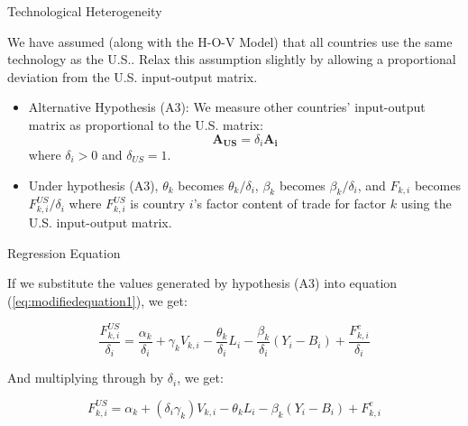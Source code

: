 \documentclass[aspectratio=169]{beamer}
\begin{document}
\begin{frame}{Technological Heterogeneity}

We have assumed (along with the H-O-V Model) that all countries use the same technology as the U.S..  Relax this assumption slightly by allowing a proportional deviation from the U.S. input-output matrix.

\begin{itemize}
    \item<1-> Alternative Hypothesis (A3):  We measure other countries’ input-output matrix as proportional to the U.S. matrix:
    \begin{equation*}
        \mathbf{A_{US}} = \delta_{i} \mathbf{A_{i}}
    \end{equation*}
    where $ \delta_{i} > 0 $ and $ \delta_{US} = 1 $.
    \item<2-> Under hypothesis (A3), $ \theta_{k} $ becomes $ \theta_{k} / \delta_{i} $, $ \beta_{k} $ becomes $ \beta_{k} / \delta_{i} $, and $ F_{k,i} $ becomes $ F_{k,i}^{US} / \delta_{i} $ where $ F_{k,i}^{US} $ is country $ i $'s factor content of trade for factor $ k $ using the U.S. input-output matrix.
\end{itemize}
    
\end{frame}


\begin{frame}{Regression Equation}

If we substitute the values generated by hypothesis (A3) into equation (\ref{eq:modifiedequation1}), we get:

\begin{equation*}
    \frac{F_{k,i}^{US}}{\delta_{i}} = \frac{\alpha_{k}}{\delta_{i}} + \gamma_{k}V_{k,i} - \frac{\theta_{k}}{\delta_{i}}L_{i} - \frac{\beta_{k}}{\delta_{i}}\left( Y_{i} - B_{i} \right) + \frac{F_{k,i}^{e}}{\delta_{i}}
\end{equation*}

And multiplying through by $ \delta_{i} $, we get:

\begin{equation}
    F_{k,i}^{US} = \alpha_{k} + \left( \delta_{i} \gamma_{k} \right)V_{k,i} - \theta_{k}L_{i} - \beta_{k}\left( Y_{i} - B_{i} \right) + F_{k,i}^{e}
    \label{eq:generalregressionmodel}
\end{equation}
    
\end{frame}
\end{document}
